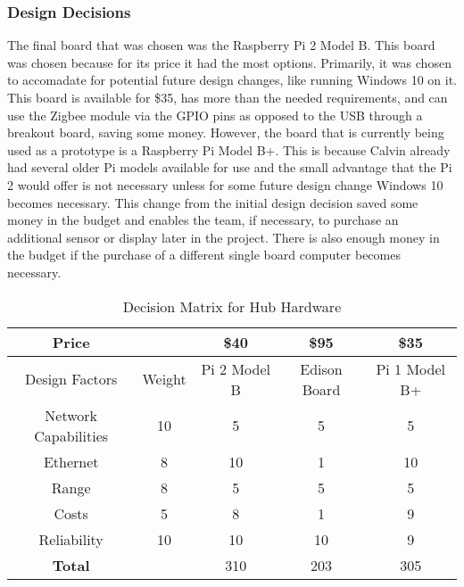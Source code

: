 \documentclass[PPFS.tex]{template/subfiles}
\begin{document}
\subsubsection{Design Decisions}
The final board that was chosen was the Raspberry Pi 2 Model B. This board was chosen because for its price it had the most options. Primarily, it was chosen to accomadate for potential future design changes, like running Windows 10 on it. This board is available for \$35, has more than the needed requirements, and can use the Zigbee module via the GPIO pins as opposed to the USB through a breakout board, saving some money. However, the board that is currently being used as a prototype is a Raspberry Pi Model B+. This is because Calvin already had several older Pi models available for use and the small advantage that the Pi 2 would offer is not necessary unless for some future design change Windows 10 becomes necessary. This change from the initial design decision saved some money in the budget and enables the team, if necessary, to purchase an additional sensor or display later in the project. There is also enough money in the budget if the purchase of a different single board computer becomes necessary.

       \begin{table}[h!]
       	\begin{center}
       		\caption{Decision Matrix for Hub Hardware}
       		\label{tab:hubMatrix}
       		\begin{tabular}{|c|c|c|c|c|}
       			\hline
       			Price && \$40 & \$95 & \$35 \\
       			\hline
       			Design Factors & Weight & Pi 2 Model B & Edison Board & Pi 1 Model B+ \\
       			\hline
       			Network Capabilities & 10 & 5 & 5 & 5\\
       			\hline
       			Ethernet & 8 & 10 & 1 & 10 \\
       			\hline
       			Range & 8 & 5 & 5 & 5 \\
       			\hline
       			Costs & 5 & 8 & 1 & 9 \\
       			\hline
       			Reliability & 10 & 10 & 10 & 9 \\
       			\hline
       			\textbf{Total} && 310 & 203 & 305 \\
       			\hline
       		\end{tabular}
       	\end{center}
       \end{table}
\end{document}
